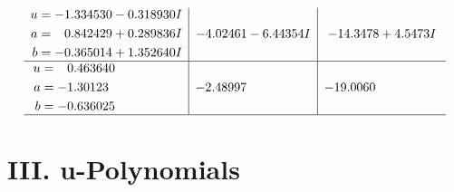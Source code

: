 \documentclass[1p]{elsarticle_modified}
\theoremstyle{definition}
\begin{document}
$$\begin{array}{c|c|c}
\begin{aligned}
u &= -1.334530 - 0.318930 I \\
a &= \phantom{-}0.842429 + 0.289836 I \\
b &= -0.365014 + 1.352640 I\end{aligned}
 & -4.02461 - 6.44354 I & -14.3478 + 4.5473 I \\ \hline\begin{aligned}
u &= \phantom{-}0.463640\phantom{ +0.000000I} \\
a &= -1.30123\phantom{ +0.000000I} \\
b &= -0.636025\phantom{ +0.000000I}\end{aligned}
 & -2.48997\phantom{ +0.000000I} & -19.0060\phantom{ +0.000000I}\\
 \hline 
 \end{array}$$\newpage
\newpage\renewcommand{\arraystretch}{1}
\centering \section*{ III. u-Polynomials}
\end{document}
